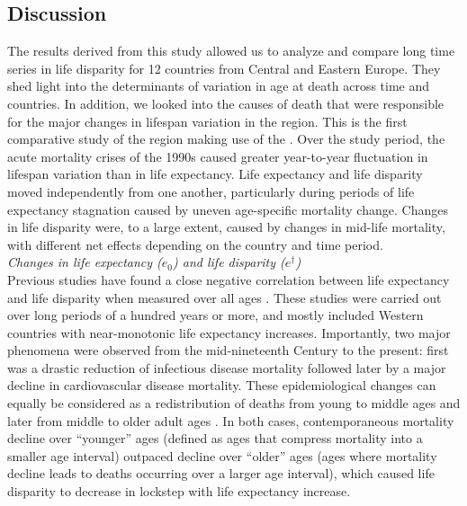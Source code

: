 \documentclass{article}
\begin{document}
\begin{spacing}{1.5}
\section*{Discussion}

The results derived from this study allowed us to analyze and compare long time series in life disparity for 12 countries from Central and Eastern Europe. They shed light into the determinants of variation in age at death across time and countries. In addition, we looked into the causes of death that were responsible for the major changes in lifespan variation in the region. This is the first comparative study of the region making use of the \citet{HcO}. Over the study period, the acute mortality crises of the 1990s caused greater year-to-year fluctuation in lifespan variation than in life expectancy. Life expectancy and life disparity moved independently from one another, particularly during periods of life expectancy stagnation caused by uneven age-specific mortality change. Changes in life disparity were, to a large extent, caused by changes in mid-life mortality, with different net effects depending on the country and time period. \\

 
\emph{Changes in life expectancy ($e_0$) and life disparity ($e^\dagger$)}\\

Previous studies have found a close negative correlation between life expectancy and life disparity when measured over all ages  \citep{ wilmoth1999,vaupel2011,colchero2016emergence}. These studies were carried out over long periods of a hundred years or more, and mostly included Western countries with near-monotonic life expectancy increases. Importantly, two major phenomena were observed from the mid-nineteenth Century to the present: first was a drastic reduction of infectious disease mortality followed later by a major decline in cardiovascular disease mortality. These epidemiological changes can equally be considered as a redistribution of deaths from young to middle ages and later from middle to older adult ages \citep{robine2001redefining}. In both cases, contemporaneous mortality decline over ``younger'' ages (defined as ages that compress mortality into a smaller age interval) outpaced decline over ``older'' ages (ages where mortality decline leads to deaths occurring over a larger age interval), which caused life disparity to decrease in lockstep with life expectancy increase.\\


\end{spacing}
\end{document}
